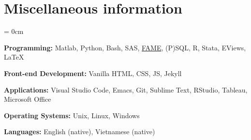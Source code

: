 \documentclass[a4paper, 10pt]{article}
\begin{document}
  \section{Miscellaneous information}
  \begin{compactitem}\parskip = 0cm
    \item \textbf{Programming:} Matlab, Python, Bash, SAS, \href{https://en.wikipedia.org/wiki/FAME_(database)}{FAME}, (P)SQL, R, Stata, EViews, \LaTeX
    \item \textbf{Front-end Development:} Vanilla HTML, CSS, JS, Jekyll
    \item \textbf{Applications:} Visual Studio Code, Emacs, Git, Sublime Text, RStudio, Tableau, Microsoft Office
    \item \textbf{Operating Systems:} Unix, Linux, Windows
    \item \textbf{Languages:} English (native), Vietnamese (native)
  \end{compactitem}
\end{document}
